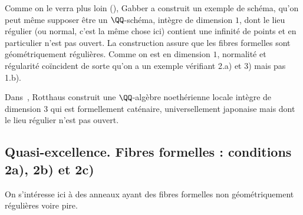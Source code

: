\documentclass[10pt]{../fichiers-configuration-latex/smfart}
\begin{document}
 Comme on le verra plus loin (), Gabber a construit un exemple de
schéma, qu'on peut même supposer être un $\QQ$-schéma,  intègre de dimension $1$, dont le lieu
régulier (ou normal, c'est la même chose ici) contient une infinité de points et en particulier
n'est pas ouvert. La construction assure que les fibres formelles sont géométriquement régulières.
Comme on est en dimension $1$, normalité et régularité coïncident de sorte qu'on a un exemple
vérifiant 2.a) et 3) mais pas 1.b).

 Dans~\cite{Rot79}, Rotthaus construit une $\QQ$-algèbre noethérienne locale intègre de dimension
$3$ qui est formellement caténaire, universellement japonaise mais dont le lieu régulier n'est pas
ouvert.

\subsection{Quasi-excellence. Fibres formelles : conditions 2a), 2b) et 2c)}\label{1ex-non-uni-2} On
s'intéresse ici à des anneaux ayant des fibres formelles non géométriquement régulières voire pire.
\end{document}
